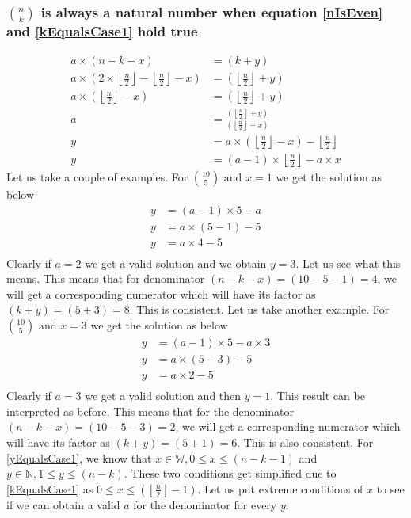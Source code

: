 \documentclass[10pt, twoside]{article}
\newcommand*{\Combination}[2]{\binom{#1}{#2}}%
\newcommand{\floordivision}[2]{\left\lfloor \frac{#1}{#2} \right\rfloor}
\begin{document}
\subsubsection{$\Combination{n}{k}$ is always a natural number when equation \eqref{nIsEven} and \eqref{kEqualsCase1} hold true}\label{ProofkEqualsCase1}
\begin{align}
	a \times (n-k-x) &= (k+y) \nonumber \\
	a \times (2\times \floordivision{n}{2} - \floordivision{n}{2} -x) &= (\floordivision{n}{2}+y) \nonumber \\
	a \times(\floordivision{n}{2} -x) &= (\floordivision{n}{2} + y) \nonumber \\
	a &= \frac{(\floordivision{n}{2}+y)}{(\floordivision{n}{2}-x)} \nonumber\\
	y &= a\times(\floordivision{n}{2}-x) - \floordivision{n}{2} \nonumber \\
	y &= (a-1)\times \floordivision{n}{2} - a\times x \label{yEqualsCase1}
\end{align}
Let us take a couple of examples. \newline
For $\Combination{10}{5} \text{ and } x = 1$ we get the solution as below
\begin{align*}
	y &= (a-1)\times 5 - a \\
	y &= a \times (5 - 1) - 5 \\
	y &= a \times 4 - 5 \\
\end{align*}
Clearly if $a = 2$ we get a valid solution and we obtain $y=3$. Let us see what this means. This means that for denominator $(n-k-x) = (10-5-1) = 4$, we will get a corresponding numerator which will have its factor as $(k+y) = (5+3) = 8$. This is consistent. Let us take another example.\newline
For $\Combination{10}{5} \text{ and } x = 3$ we get the solution as below
\begin{align*}
	y &= (a-1)\times 5 - a \times 3 \\
	y &= a \times (5 - 3) - 5 \\
	y &= a \times 2 - 5 \\
\end{align*}
Clearly if $a = 3$ we get a valid solution and then $y=1$. This result can be interpreted as before. This means that for the denominator $(n-k-x) = (10-5-3) = 2$, we will get a corresponding numerator which will have its factor as $(k+y) = (5+1) = 6$. This is also consistent.\newline
For \eqref{yEqualsCase1}, we know that $x \in \mathbb{W}, 0 \leq x \leq (n-k-1)$ and $y \in \mathbb{N}, 1 \leq y \leq (n-k)$. These two conditions get simplified due to \eqref{kEqualsCase1} as $0 \leq x \leq (\floordivision{n}{2}-1)$. Let us put extreme conditions of $x$ to see if we can obtain a valid \textbf{$a$} for the denominator for every $y$.
\end{document}
